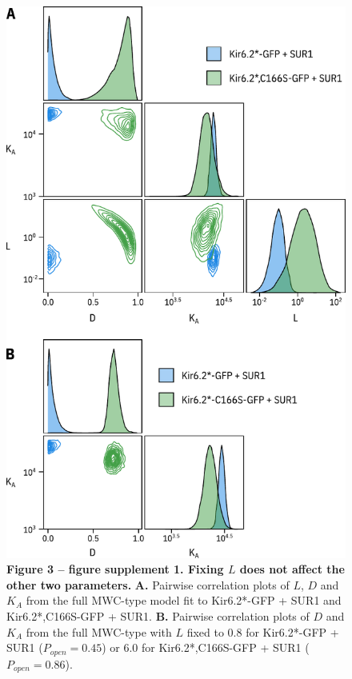 \documentclass[10pt,lineno, doublespacing]{elife}
\begin{document}
\begin{figure}
\begin{fullwidth}
\centering
\includegraphics[height=0.88\textheight]{figure_three_s1}
\captionsetup{labelformat=empty}
\caption{
\textbf{Figure 3 -- figure supplement 1. Fixing $L$ does not affect the other two parameters.}
\textbf{A.}
Pairwise correlation plots of $L$, $D$ and $K_A$ from the full MWC-type model fit to Kir6.2*-GFP + SUR1 and Kir6.2*,C166S-GFP + SUR1.
\textbf{B.}
Pairwise correlation plots of $D$ and $K_A$ from the full MWC-type with $L$ fixed to 0.8 for Kir6.2*-GFP + SUR1 ($P_{open} = 0.45$) or 6.0 for Kir6.2*,C166S-GFP + SUR1 ($P_{open} = 0.86$).
}
\label{fig:three_s1}
\end{fullwidth}
\end{figure}
\end{document}
